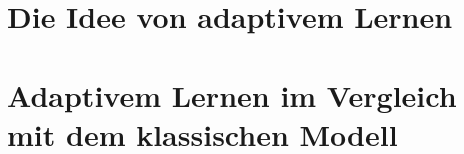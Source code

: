 \section{Die Idee von adaptivem Lernen}


\section{Adaptivem Lernen im Vergleich mit dem klassischen Modell}
